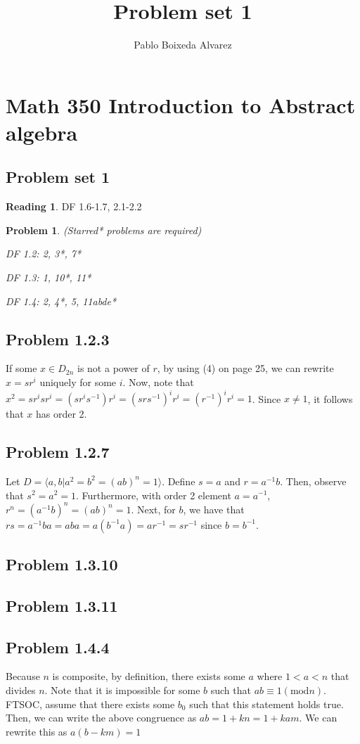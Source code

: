 \documentclass[11 pt]{article}
\title{Problem set 1}
\author{Pablo Boixeda Alvarez}
\newtheorem{Prob}{Problem}
\theoremstyle{definition}
\newtheorem{re}{Reading}
\theoremstyle{remark}
\begin{document}
\section*{Math 350 Introduction to Abstract algebra}
\subsection*{Problem set 1}

\begin{re}
	DF 1.6-1.7, 2.1-2.2
\end{re}
\begin{Prob} (Starred* problems are required)
	
	DF 1.2: 2, 3*, 7*
	
	DF 1.3: 1, 10*, 11*
	
	DF 1.4: 2, 4*, 5, 11abde*
\end{Prob}

\subsection*{Problem 1.2.3}
If some $x \in D_{2n}$ is not a power of $r$, by using (4) on page 25, we can rewrite $x = sr^i$ uniquely for some $i$. Now, note that $x^2 = sr^isr^i = (sr^is^{-1})r^i = (srs^{-1})^ir^i= (r^{-1})^ir^i= 1$. Since $x \neq 1$, it follows that $x$ has order 2. 

\subsection*{Problem 1.2.7}
Let $D = \langle a,b | a^2=b^2=(ab)^n=1\rangle$. Define $s=a$ and $r=a^{-1}b$. Then, observe that $s^2=a^2=1$. Furthermore, with order 2 element $a=a^{-1}$, $r^n=(a^{-1}b)^n = (ab)^n = 1$. Next, for $b$, we have that $rs = a^{-1}ba = aba = a(b^{-1}a) = ar^{-1} = sr^{-1}$ since $b=b^{-1}$. 
\subsection*{Problem 1.3.10}

\subsection*{Problem 1.3.11}

\subsection*{Problem 1.4.4}
Because $n$ is composite, by definition, there exists some $a$ where $1 < a < n$ that divides $n$. Note that it is impossible for some $b$ such that $ab \equiv 1 (\textrm{mod} n)$. FTSOC, assume that there exists some $b_0$ such that this statement holds true. Then, we can write the above congruence as $ab = 1 + kn = 1 + kam$. We can rewrite this as $a(b-km) = 1$
\end{document}
